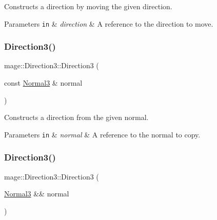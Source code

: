 Constructs a direction by moving the given direction.


\begin{DoxyParams}[1]{Parameters}
\mbox{\tt in}  & {\em direction} & A reference to the direction to move. \\
\hline
\end{DoxyParams}
\hypertarget{structmage_1_1_direction3_a3f4daf4fbf2e873bcf9133eca22fad34}{}\label{structmage_1_1_direction3_a3f4daf4fbf2e873bcf9133eca22fad34} 
\subsubsection{\texorpdfstring{Direction3()}{Direction3()}\hspace{0.1cm}{\footnotesize\ttfamily [5/8]}}
{\footnotesize\ttfamily mage\+::\+Direction3\+::\+Direction3 (\begin{DoxyParamCaption}\item[{const \hyperlink{structmage_1_1_normal3}{Normal3} \&}]{normal }\end{DoxyParamCaption})\hspace{0.3cm}{\ttfamily [noexcept]}}

Constructs a direction from the given normal.


\begin{DoxyParams}[1]{Parameters}
\mbox{\tt in}  & {\em normal} & A reference to the normal to copy. \\
\hline
\end{DoxyParams}
\hypertarget{structmage_1_1_direction3_ae9b26ed667537e7751b495058bb71de0}{}\label{structmage_1_1_direction3_ae9b26ed667537e7751b495058bb71de0} 
\subsubsection{\texorpdfstring{Direction3()}{Direction3()}\hspace{0.1cm}{\footnotesize\ttfamily [6/8]}}
{\footnotesize\ttfamily mage\+::\+Direction3\+::\+Direction3 (\begin{DoxyParamCaption}\item[{\hyperlink{structmage_1_1_normal3}{Normal3} \&\&}]{normal }\end{DoxyParamCaption})\hspace{0.3cm}{\ttfamily [noexcept]}}

